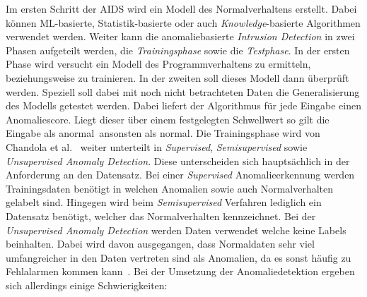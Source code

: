                 Im ersten Schritt der AIDS wird ein Modell des Normalverhaltens erstellt.
                Dabei können ML-basierte, Statistik-basierte oder auch 
                \textit{Knowledge}-basierte  Algorithmen verwendet werden.
                Weiter kann die anomaliebasierte \textit{Intrusion Detection} in zwei Phasen aufgeteilt werden,
                die \textit{Trainingsphase} sowie die \textit{Testphase}.
                In der ersten Phase wird versucht ein Modell des Programmverhaltens zu ermitteln,
                beziehungsweise zu trainieren.
                In der zweiten soll dieses Modell dann überprüft werden.
                Speziell soll dabei mit noch nicht betrachteten Daten die Generalisierung des Modells getestet werden. 
                Dabei liefert der Algorithmus für jede Eingabe einen Anomaliescore.
                Liegt dieser über einem festgelegten Schwellwert so gilt die Eingabe als 
                \glqq anormal\grqq \ ansonsten als \glqq normal\grqq.
                Die Trainingsphase wird von Chandola et al.~\cite{ANOMALYSURVEY} weiter unterteilt in \textit{Supervised},
                \textit{Semisupervised} sowie \textit{Unsupervised Anomaly Detection}.
                Diese unterscheiden sich hauptsächlich in der Anforderung an den Datensatz. 
                Bei einer \textit{Supervised} Anomalieerkennung werden Trainingsdaten benötigt 
                in welchen Anomalien sowie auch Normalverhalten gelabelt sind.
                Hingegen wird beim \textit{Semisupervised} Verfahren lediglich ein Datensatz benötigt,
                welcher das Normalverhalten kennzeichnet.
                Bei der \textit{Unsupervised Anomaly Detection} werden Daten verwendet welche keine Labels beinhalten.
                Dabei wird davon ausgegangen, dass Normaldaten sehr viel umfangreicher in den Daten vertreten sind als Anomalien,
                da es sonst häufig zu Fehlalarmen kommen kann~\cite{ANOMALYSURVEY2}.
                Bei der Umsetzung der Anomaliedetektion ergeben sich allerdings einige Schwierigkeiten:
